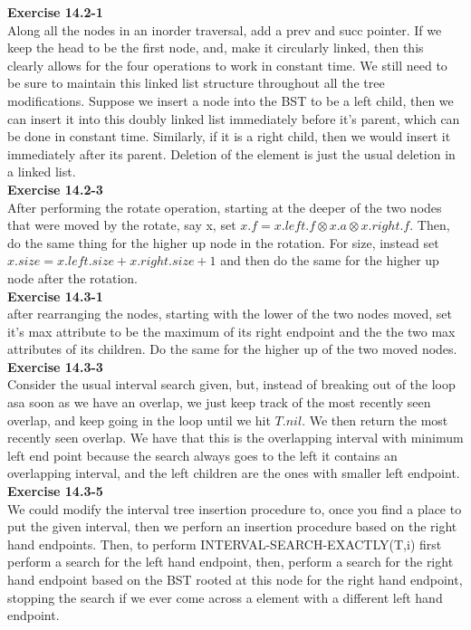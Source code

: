 \documentclass{article}
\begin{document}
\noindent\textbf{ Exercise 14.2-1} \\
Along all the nodes in an inorder traversal, add a prev and succ pointer. If we keep the head to be the first node, and, make it circularly linked, then this clearly allows for the four operations to work in constant time. We still need to be sure to maintain this linked list structure throughout all the tree modifications. Suppose we insert a node into the BST to be a left child, then we can insert it into this doubly linked list immediately before it's parent, which can be done in constant time. Similarly, if it is a right child, then we would insert it immediately after its parent. Deletion of the element is just the usual deletion in a linked list.\\


\noindent\textbf{ Exercise 14.2-3} \\
After performing the rotate operation, starting at the deeper of the two nodes that were moved by the rotate, say x, set $x.f  = x.left.f \otimes x.a \otimes x.right.f$. Then, do the same thing for the higher up node in the rotation. For size, instead set $x.size = x.left.size+ x.right.size + 1$ and then do the same for the higher up node after the rotation.\\

\noindent\textbf{ Exercise 14.3-1} \\
after rearranging the nodes, starting with the lower of the two nodes moved, set it's max attribute to be the maximum of its right endpoint and the the two max attributes of its children. Do the same for the higher up of the two moved nodes.\\


\noindent\textbf{ Exercise 14.3-3} \\
Consider the usual interval search given, but, instead of breaking out of the loop asa soon as we have an overlap, we just keep track of the most recently seen overlap, and keep going in the loop until we hit $T.nil$. We then return the most recently seen overlap. We have that this is the overlapping interval with minimum left end point because the search always goes to the left it contains an overlapping interval, and the left children are the ones with smaller left endpoint.\\

\noindent\textbf{ Exercise 14.3-5} \\
We could modify the interval tree insertion procedure to, once you find a place to put the given interval, then we perforn an insertion procedure based on the right hand endpoints. Then, to perform INTERVAL-SEARCH-EXACTLY(T,i) first perform a search for the left hand endpoint, then, perform a search for the right hand endpoint based on the BST rooted at this node for the right hand endpoint, stopping the search if we ever come across a element with a different left hand endpoint.\\
\end{document}
